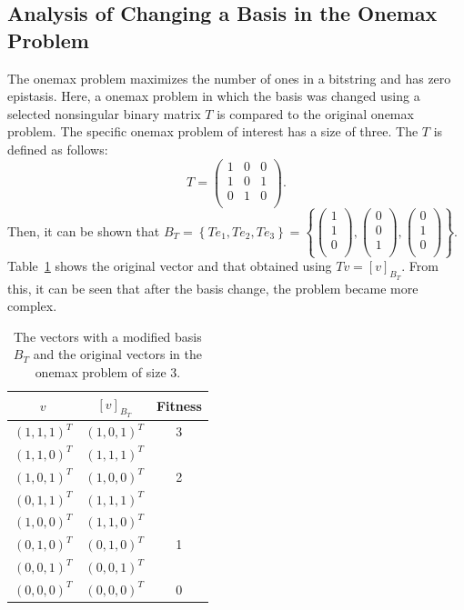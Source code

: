 \subsection{Analysis of Changing a Basis in the Onemax Problem} \label{sec32:cob_onemax}
The onemax problem maximizes the number of ones in a bitstring and has zero epistasis. Here, a onemax problem in which the basis was changed using a selected nonsingular binary matrix $ T $ is compared to the original onemax problem. The specific onemax problem of interest has a size of three. The $ T $ is defined as follows:
\begin{equation*}
T=\left(\begin{matrix}1&0&0\\1&0&1\\0&1&0\\\end{matrix}\right).
\end{equation*}
Then, it can be shown that $ B_T=\left\{Te_1,Te_2,Te_3\right\}=\left\{\left(\begin{matrix}1\\1\\0\\\end{matrix}\right),  \left(\begin{matrix}0\\0\\1\\\end{matrix}\right),\left(\begin{matrix}0\\1\\0\\\end{matrix}\right)\right\}$. Table~\ref{tab:onemax} shows the original vector and that obtained using $ Tv=\left[v\right]_{B_T} $. From this, it can be seen that after the basis change, the problem became more complex.
\begin{table}[ht!]
	\caption{The vectors with a modified basis $ B_T $ and the original vectors in the onemax problem of size 3.} \label{tab:onemax}
	\centering
	\vspace{0.2cm}
	\begin{tabular}{ccc}
		\toprule
		$ v $ & $ \left[v \right]_{B_T} $ & Fitness   \\ 
		\midrule
		$ (1,1,1)^T $ & $ (1,0,1)^T $ & 3   \\ \midrule
		$ (1,1,0)^T $ & $ (1,1,1)^T $ &    \\
		$ (1,0,1)^T $ & $ (1,0,0)^T $ & 2   \\
		$ (0,1,1)^T $ & $ (1,1,1)^T $ &    \\ \midrule
		$ (1,0,0)^T $ & $ (1,1,0)^T $ &    \\
		$ (0,1,0)^T $ & $ (0,1,0)^T $ & 1   \\
		$ (0,0,1)^T $ & $ (0,0,1)^T $ &    \\ \midrule
		$ (0,0,0)^T $ & $ (0,0,0)^T $ & 0   \\
		\bottomrule
	\end{tabular}
\end{table}
